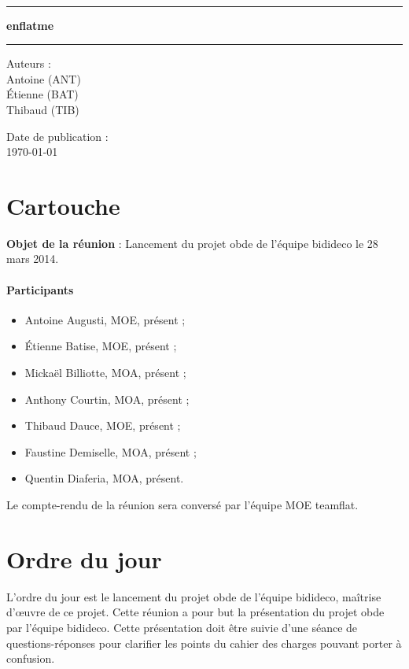 \documentclass[a4paper, 12pt, french]{article}
\newcommand{\nomProjet}{enflatme\xspace}
\begin{document}
	\begin{titlepage}
		\begin{center}
			\LARGE{} \\
		    \rule{\linewidth}{1.5pt}
		    \huge{\textbf{\nomProjet}}
		    \rule{\linewidth}{1.5pt} \newline{} \newline{}
		\end{center}
		\begin{center}
		    \large{Auteurs :}\\ Antoine  (ANT)\\ Étienne  (BAT) \\ Thibaud  (TIB)
		\end{center}
		\vspace{50px}
		\begin{center}
			\large{Date de publication :}\\ \today
		\end{center}
	\end{titlepage}
	\newpage

	\section{Cartouche}
		\textbf{Objet de la réunion} : Lancement du projet obde de l'équipe bidideco le 28 mars 2014.
		\paragraph{Participants}{
			\begin{itemize}
				\item Antoine Augusti, MOE, présent ;
				\item Étienne Batise, MOE, présent ;
				\item Mickaël Billiotte, MOA, présent ;
				\item Anthony Courtin, MOA, présent ;
				\item Thibaud Dauce, MOE, présent ;
				\item Faustine Demiselle, MOA, présent ;
				\item Quentin Diaferia, MOA, présent.
			\end{itemize}
		}
		\vspace{20px}
		Le compte-rendu de la réunion sera conversé par l'équipe MOE teamflat.
	\section{Ordre du jour}
		L'ordre du jour est le lancement du projet obde de l'équipe bidideco, maîtrise d’œuvre de ce projet. Cette réunion a pour but la présentation du projet obde par l'équipe bidideco. Cette présentation doit être suivie d'une séance de questions-réponses pour clarifier les points du cahier des charges pouvant porter à confusion.
\end{document}
